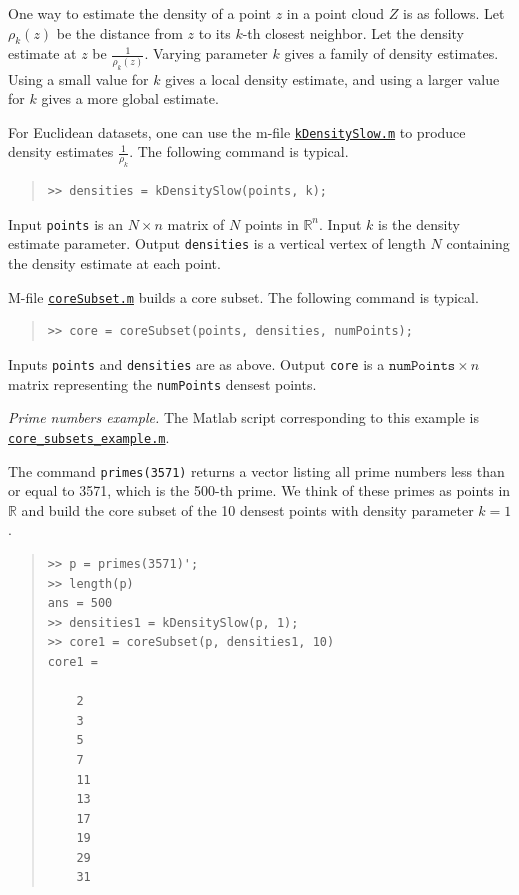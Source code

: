 \documentclass[amscd, amssymb, verbatim]{amsart}[12pt]
\theoremstyle{remark}
\theoremstyle{remark}
\theoremstyle{remark}
\begin{document}
One way to estimate the density of a point $z$ in a point cloud $Z$ is as follows. Let $\rho_k(z)$ be the distance from $z$ to its $k$-th closest neighbor. Let the density estimate at $z$ be $\frac{1}{\rho_k(z)}$. Varying parameter $k$ gives a family of density estimates. Using a small value for $k$ gives a local density estimate, and using a larger value for $k$ gives a more global estimate. 

For Euclidean datasets, one can use the m-file \href{https://github.com/appliedtopology/javaplex/tree/master/src/matlab/for_distribution/tutorial_examples/kDensitySlow.m}{\texttt{kDensitySlow.m}} to produce density estimates $\frac{1}{\rho_k}$. The following command is typical.

\begin{quote} \begin{verbatim}
>> densities = kDensitySlow(points, k); 
\end{verbatim} \end{quote}

Input \texttt{points} is an $N\times n$ matrix of $N$ points in $\mathbb{R}^n$. Input $k$ is the density estimate parameter. Output \texttt{densities} is a vertical vertex of length $N$ containing the density estimate at each point. 

M-file \href{https://github.com/appliedtopology/javaplex/tree/master/src/matlab/for_distribution/tutorial_examples/coreSubset.m}{\texttt{coreSubset.m}} builds a core subset. The following command is typical.

\begin{quote} \begin{verbatim}
>> core = coreSubset(points, densities, numPoints); 
\end{verbatim} \end{quote}

Inputs \texttt{points} and \texttt{densities} are as above. Output \texttt{core} is a $\texttt{numPoints}\times n$ matrix representing the \texttt{numPoints} densest points. 

{\em Prime numbers example.} The Matlab script corresponding to this example is \href{https://github.com/appliedtopology/javaplex/tree/master/src/matlab/for_distribution/tutorial_examples/core_subsets_example.m}{\texttt{core\_subsets\_example.m}}.

The command \texttt{primes(3571)} returns a vector listing all prime numbers less than or equal to 3571, which is the 500-th prime. We think of these primes as points in $\mathbb{R}$ and build the core subset of the 10 densest points with density parameter $k = 1$.
\begin{quote} \begin{verbatim} 
>> p = primes(3571)';
>> length(p)
ans = 500
>> densities1 = kDensitySlow(p, 1);
>> core1 = coreSubset(p, densities1, 10)
core1 =

    2
    3
    5
    7
    11
    13
    17
    19
    29
    31
\end{verbatim} \end{quote}
\end{document}

